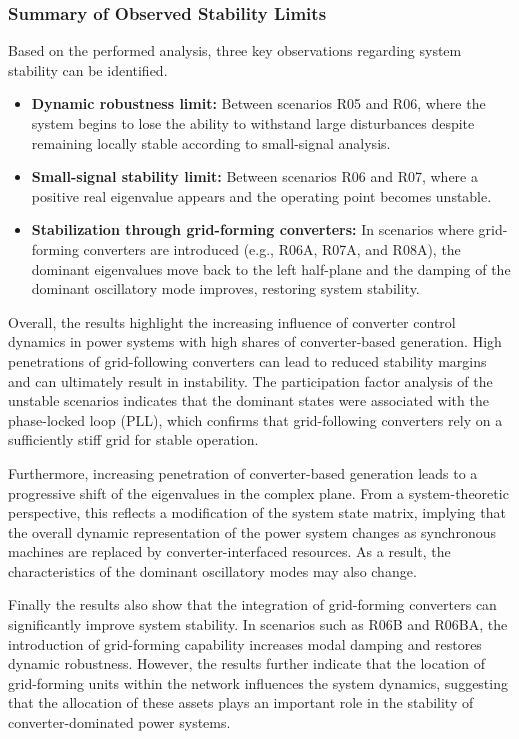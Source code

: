 \subsubsection{Summary of Observed Stability Limits}

Based on the performed analysis, three key observations regarding system stability can be identified.

\begin{itemize}

\item \textbf{Dynamic robustness limit:} Between scenarios R05 and R06, where the system begins to lose the ability to withstand large disturbances despite remaining locally stable according to small-signal analysis.

\item \textbf{Small-signal stability limit:} Between scenarios R06 and R07, where a positive real eigenvalue appears and the operating point becomes unstable.

\item \textbf{Stabilization through grid-forming converters:} In scenarios where grid-forming converters are introduced (e.g., R06A, R07A, and R08A), the dominant eigenvalues move back to the left half-plane and the damping of the dominant oscillatory mode improves, restoring system stability.

\end{itemize}

Overall, the results highlight the increasing influence of converter control dynamics in power systems with high shares of converter-based generation. High penetrations of grid-following converters can lead to reduced stability margins and can ultimately result in instability. The participation factor analysis of the unstable scenarios indicates that the dominant states were associated with the phase-locked loop (PLL), which confirms that grid-following converters rely on a sufficiently stiff grid for stable operation.

Furthermore, increasing penetration of converter-based generation leads to a progressive shift of the eigenvalues in the complex plane. From a system-theoretic perspective, this reflects a modification of the system state matrix, implying that the overall dynamic representation of the power system changes as synchronous machines are replaced by converter-interfaced resources. As a result, the characteristics of the dominant oscillatory modes may also change.

Finally the results also show that the integration of grid-forming converters can significantly improve system stability. In scenarios such as R06B and R06BA, the introduction of grid-forming capability increases modal damping and restores dynamic robustness. However, the results further indicate that the location of grid-forming units within the network influences the system dynamics, suggesting that the allocation of these assets plays an important role in the stability of converter-dominated power systems.

